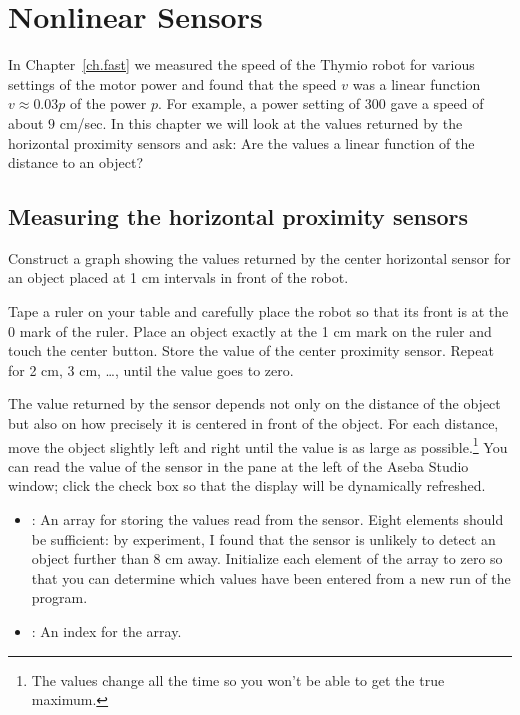
\chapter{Nonlinear Sensors}\label{ch.nonlinear}

In Chapter~\ref{ch.fast} we measured the speed of the Thymio robot for
various settings of the motor power and found that the speed $v$ was a
linear function $v \approx 0.03p$ of the power $p$. For example, a power
setting of $300$ gave a speed of about $9$ cm/sec. In this chapter we
will look at the values returned by the horizontal proximity sensors and
ask: Are the values a linear function of the distance to an object?

\section{Measuring the horizontal proximity sensors}


Construct a graph showing the values returned by the center horizontal
sensor for an object placed at 1 cm intervals in front of
the robot.


Tape a ruler on your table and carefully place the robot so that its
front is at the 0 mark of the ruler. Place an object exactly at the 1
cm mark on the ruler and touch the center button. Store the value of
the center proximity sensor. Repeat for 2 cm, 3 cm, \ldots, until the
value goes to zero.

The value returned by the sensor depends not only on the distance of the
object but also on how precisely it is centered in front of the
object. For each distance, move the object slightly left and right
until the value is as large as possible.\footnote{The values change all
the time so you won't be able to get the true maximum.} You can read the
value of the sensor in the  pane at the left of the Aseba
Studio window; click the check box  so that the display will be
dynamically refreshed.


\begin{itemize}

\item {}: An array for storing the values read from the
sensor. Eight elements should be sufficient: by experiment, I found that
the sensor is unlikely to detect an object further than 8 cm away.
Initialize each element of the array to zero so that you can determine
which values have been entered from a new run of the program.

\item {}: An index for the array. 

\end{itemize}

